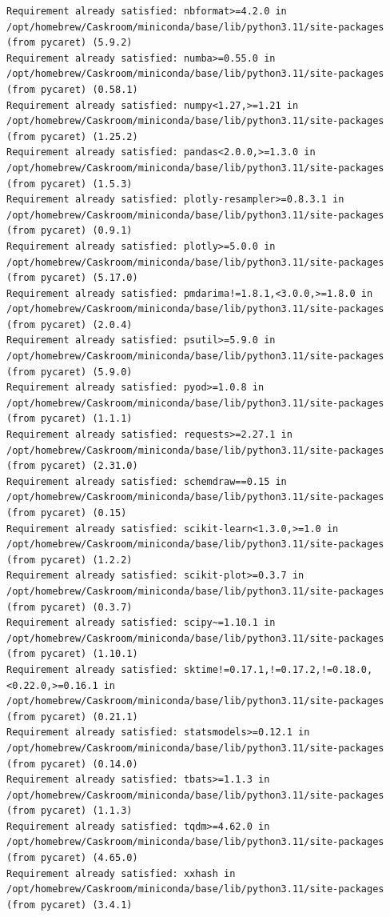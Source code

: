 \documentclass[
  letterpaper,
  DIV=11,
  numbers=noendperiod]{scrartcl}
\begin{document}
\begin{verbatim}
Requirement already satisfied: nbformat>=4.2.0 in /opt/homebrew/Caskroom/miniconda/base/lib/python3.11/site-packages (from pycaret) (5.9.2)
Requirement already satisfied: numba>=0.55.0 in /opt/homebrew/Caskroom/miniconda/base/lib/python3.11/site-packages (from pycaret) (0.58.1)
Requirement already satisfied: numpy<1.27,>=1.21 in /opt/homebrew/Caskroom/miniconda/base/lib/python3.11/site-packages (from pycaret) (1.25.2)
Requirement already satisfied: pandas<2.0.0,>=1.3.0 in /opt/homebrew/Caskroom/miniconda/base/lib/python3.11/site-packages (from pycaret) (1.5.3)
Requirement already satisfied: plotly-resampler>=0.8.3.1 in /opt/homebrew/Caskroom/miniconda/base/lib/python3.11/site-packages (from pycaret) (0.9.1)
Requirement already satisfied: plotly>=5.0.0 in /opt/homebrew/Caskroom/miniconda/base/lib/python3.11/site-packages (from pycaret) (5.17.0)
Requirement already satisfied: pmdarima!=1.8.1,<3.0.0,>=1.8.0 in /opt/homebrew/Caskroom/miniconda/base/lib/python3.11/site-packages (from pycaret) (2.0.4)
Requirement already satisfied: psutil>=5.9.0 in /opt/homebrew/Caskroom/miniconda/base/lib/python3.11/site-packages (from pycaret) (5.9.0)
Requirement already satisfied: pyod>=1.0.8 in /opt/homebrew/Caskroom/miniconda/base/lib/python3.11/site-packages (from pycaret) (1.1.1)
Requirement already satisfied: requests>=2.27.1 in /opt/homebrew/Caskroom/miniconda/base/lib/python3.11/site-packages (from pycaret) (2.31.0)
Requirement already satisfied: schemdraw==0.15 in /opt/homebrew/Caskroom/miniconda/base/lib/python3.11/site-packages (from pycaret) (0.15)
Requirement already satisfied: scikit-learn<1.3.0,>=1.0 in /opt/homebrew/Caskroom/miniconda/base/lib/python3.11/site-packages (from pycaret) (1.2.2)
Requirement already satisfied: scikit-plot>=0.3.7 in /opt/homebrew/Caskroom/miniconda/base/lib/python3.11/site-packages (from pycaret) (0.3.7)
Requirement already satisfied: scipy~=1.10.1 in /opt/homebrew/Caskroom/miniconda/base/lib/python3.11/site-packages (from pycaret) (1.10.1)
Requirement already satisfied: sktime!=0.17.1,!=0.17.2,!=0.18.0,<0.22.0,>=0.16.1 in /opt/homebrew/Caskroom/miniconda/base/lib/python3.11/site-packages (from pycaret) (0.21.1)
Requirement already satisfied: statsmodels>=0.12.1 in /opt/homebrew/Caskroom/miniconda/base/lib/python3.11/site-packages (from pycaret) (0.14.0)
Requirement already satisfied: tbats>=1.1.3 in /opt/homebrew/Caskroom/miniconda/base/lib/python3.11/site-packages (from pycaret) (1.1.3)
Requirement already satisfied: tqdm>=4.62.0 in /opt/homebrew/Caskroom/miniconda/base/lib/python3.11/site-packages (from pycaret) (4.65.0)
Requirement already satisfied: xxhash in /opt/homebrew/Caskroom/miniconda/base/lib/python3.11/site-packages (from pycaret) (3.4.1)

\end{verbatim}
\end{document}
